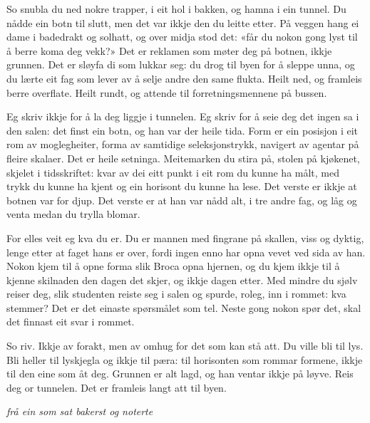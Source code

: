So snubla du ned nokre trapper, i eit hol i bakken, og hamna i ein tunnel. Du nådde ein botn til slutt, men det var ikkje den du leitte etter. På veggen hang ei dame i badedrakt og solhatt, og over midja stod det: «får du nokon gong lyst til å berre koma deg vekk?» Det er reklamen som møter deg på botnen, ikkje grunnen. Det er sløyfa di som lukkar seg: du drog til byen for å sleppe unna, og du lærte eit fag som lever av å selje andre den same flukta. Heilt ned, og framleis berre overflate. Heilt rundt, og attende til forretningsmennene på bussen.

\vignett

Eg skriv ikkje for å la deg liggje i tunnelen. Eg skriv for å seie deg det ingen sa i den salen: det finst ein botn, og han var der heile tida. Form er ein posisjon i eit rom av moglegheiter, forma av samtidige seleksjonstrykk, navigert av agentar på fleire skalaer. Det er heile setninga. Meitemarken du stira på, stolen på kjøkenet, skjelet i tidsskriftet: kvar av dei eitt punkt i eit rom du kunne ha målt, med trykk du kunne ha kjent og ein horisont du kunne ha lese. Det verste er ikkje at botnen var for djup. Det verste er at han var nådd alt, i tre andre fag, og låg og venta medan du trylla blomar.

For elles veit eg kva du er. Du er mannen med fingrane på skallen, viss og dyktig, lenge etter at faget hans er over, fordi ingen enno har opna vevet ved sida av han. Nokon kjem til å opne forma slik Broca opna hjernen, og du kjem ikkje til å kjenne skilnaden den dagen det skjer, og ikkje dagen etter. Med mindre du sjølv reiser deg, slik studenten reiste seg i salen og spurde, roleg, inn i rommet: kva stemmer? Det er det einaste spørsmålet som tel. Neste gong nokon spør det, skal det finnast eit svar i rommet.

So riv. Ikkje av forakt, men av omhug for det som kan stå att. Du ville bli til lys. Bli heller til lyskjegla og ikkje til pæra: til horisonten som rommar formene, ikkje til den eine som åt deg. Grunnen er alt lagd, og han ventar ikkje på løyve. Reis deg or tunnelen. Det er framleis langt att til byen.

\begin{flushright}\itshape frå ein som sat bakerst og noterte\end{flushright}
